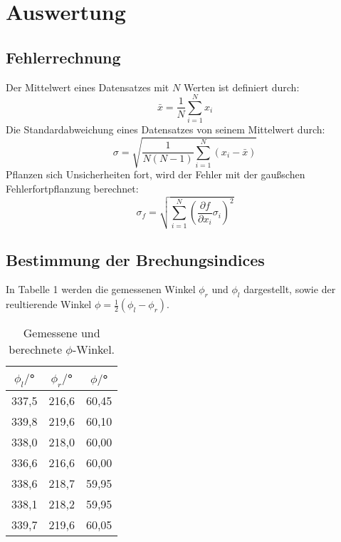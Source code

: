 \section{Auswertung}
\label{sec:Auswertung}

\subsection{Fehlerrechnung}
Der Mittelwert eines Datensatzes mit $N$ Werten ist definiert durch:
\begin{equation}
  \bar{x} = \frac{1}{N} \sum_{i=1}^N x_i
\end{equation}
Die Standardabweichung eines Datensatzes von seinem Mittelwert durch:
\begin{equation}
  \sigma = \sqrt{\frac{1}{N(N-1)} \sum_{i=1}^N (x_i - \bar{x})}
\end{equation}
Pflanzen sich Unsicherheiten fort, wird der Fehler mit der gaußschen
Fehlerfortpflanzung berechnet:
\begin{equation}
  \sigma_f = \sqrt{
      \sum\limits_{i = 1}^N
       \left( \frac{\partial f}{\partial x_i} \sigma_i \right)^{\!\! 2}
     }
\end{equation}


\subsection{Bestimmung der Brechungsindices}

In Tabelle 1 werden die gemessenen Winkel $\phi_r$ und $\phi_l$ dargestellt, sowie der reultierende Winkel $\phi=\frac{1}{2}(\phi_l-\phi_r)$.

\begin{table}[H]
  \centering
  \caption{Gemessene und berechnete $\phi$-Winkel.}
  \label{tab:spannung1}
  \begin{tabular}{c c c}
    \toprule
    $\phi_l/$° & $\phi_r/$° & $\phi/$° \\
    \midrule
    337,5  &  216,6 & 60,45     \\
    339,8  &  219,6 & 60,10      \\
    338,0  &  218,0 & 60,00      \\
    336,6  &  216,6 & 60,00      \\
    338,6  &  218,7 & 59,95      \\
    338,1  &  218,2 & 59,95      \\
    339,7  &  219,6 & 60,05      \\
    \bottomrule
  \end{tabular}
\end{table}

